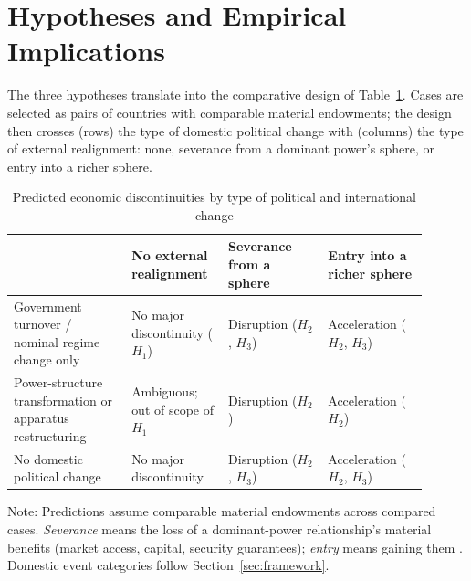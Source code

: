 \documentclass[11pt]{article}
\begin{document}
\section{Hypotheses and Empirical Implications}
\label{sec:hypotheses}

The three hypotheses translate into the comparative design of Table~\ref{tab:design}. Cases are selected as pairs of countries with comparable material endowments; the design then crosses (rows) the type of domestic political change with (columns) the type of external realignment: none, severance from a dominant power's sphere, or entry into a richer sphere.

\begin{table}[htbp]
\centering
\begin{threeparttable}
\caption{Predicted economic discontinuities by type of political and international change}
\label{tab:design}
\begin{tabular}{@{}p{0.26\linewidth}p{0.20\linewidth}p{0.22\linewidth}p{0.22\linewidth}@{}}
\toprule
 & No external realignment & Severance from a sphere & Entry into a richer sphere \\
\midrule
Government turnover / nominal regime change only & No major discontinuity ($H_1$) & Disruption ($H_2$, $H_3$) & Acceleration ($H_2$, $H_3$) \\
Power-structure transformation or apparatus restructuring & Ambiguous; out of scope of $H_1$ & Disruption ($H_2$) & Acceleration ($H_2$) \\
No domestic political change & No major discontinuity & Disruption ($H_2$, $H_3$) & Acceleration ($H_2$, $H_3$) \\
\bottomrule
\end{tabular}
\begin{tablenotes}
\small
\item Note: Predictions assume comparable material endowments across compared cases. \emph{Severance} means the loss of a dominant-power relationship's material benefits (market access, capital, security guarantees); \emph{entry} means gaining them \parencite{walt_1987,keal_1983,lake_2009}. Domestic event categories follow Section~\ref{sec:framework}.
\end{tablenotes}
\end{threeparttable}
\end{table}
\end{document}

